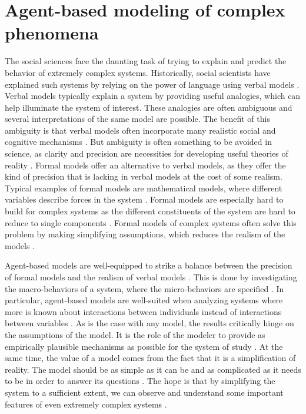 \documentclass[11pt]{article}
\begin{document}
\section{Agent-based modeling of complex phenomena}
The social sciences face the daunting task of trying to explain and predict the behavior of extremely complex systems. 
Historically, social scientists have explained such systems by relying on the power of language using verbal models \cite{smaldino_how_2020}. Verbal models typically explain a system by providing useful analogies, which can help illuminate the system of interest. These analogies are often ambiguous and several interpretations of the same model are possible. The benefit of this ambiguity is that verbal models often incorporate many realistic social and cognitive mechanisms \cite{fogarty_ten_2022}. But ambiguity is often something to be avoided in science, as clarity and precision are necessities for developing useful theories of reality \cite{smaldino_how_2020}. 
Formal models offer an alternative to verbal models, as they offer the kind of precision that is lacking in verbal models at the cost of some realism. Typical examples of formal models are mathematical models, where different variables describe forces in the system \cite{fogarty_ten_2022}. Formal models are especially hard to build for complex systems as the different constituents of the system are hard to reduce to single components \cite{smaldino_how_2020, poli2013note}. Formal models of complex systems often solve this problem by making simplifying assumptions, which reduces the realism of the models \cite{fogarty_ten_2022}. 

Agent-based models are well-equipped to strike a balance between the precision of formal models and the realism of verbal models \cite{flache_between_2018,galesic_integrating_2021,epstein1999agent,mas2014cultural}. This is done by investigating the macro-behaviors of a system, where the micro-behaviors are specified \cite{bruch_agent-based_2015,epstein1999agent,flache_between_2018}. In particular, agent-based models are well-suited when analyzing systems where more is known about interactions between individuals instead of interactions between variables \cite{geschke2019triple}. As is the case with any model, the results critically hinge on the assumptions of the model. It is the role of the modeler to provide as empirically plausible mechanisms as possible for the system of study \cite{crooks2012introduction,epstein1999agent,page2010diversity}. At the same time, the value of a model comes from the fact that it is a simplification of reality. The model should be as simple as it can be and as complicated as it needs to be in order to answer its questions \cite{smaldino_how_2020}. The hope is that by simplifying the system to a sufficient extent, we can observe and understand some important features of even extremely complex systems \cite{fogarty_ten_2022,smaldino_how_2020,smaldino_models_2016, smaldino_models_2022}.
\end{document}
